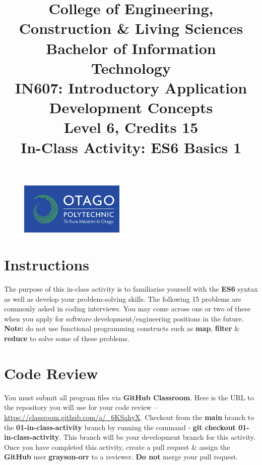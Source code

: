 \documentclass{article}
\author{}
\begin{document}
\begin{figure}
    \centering
    \includegraphics[width=50mm]{../img/logo.png}
\end{figure}

\title{College of Engineering, Construction \& Living Sciences\\Bachelor of Information Technology\\IN607: Introductory Application Development Concepts\\Level 6, Credits 15\\\textbf{In-Class Activity: ES6 Basics 1}}
\date{}
\maketitle
 
\section*{Instructions}
The purpose of this in-class activity is to familiarise yourself with the \textbf{ES6} syntax as well as develop your problem-solving skills. The following 15 problems are commonly asked in coding interviews. You may come across one or two of these when you apply for software development/engineering positions in the future. \textbf{Note:} do not use functional programming constructs such as \textbf{map}, \textbf{filter} \& \textbf{reduce} to solve some of these problems.

\section*{Code Review}
You must submit all program files via \textbf{GitHub Classroom}. Here is the URL to the repository you will use for your code review – \href{https://classroom.github.com/a/\_6KSahyX}{https://classroom.github.com/a/\_6KSahyX}. Checkout from the \textbf{main} branch to the \textbf{01-in-class-activity} branch by running the command - \textbf{git checkout 01-in-class-activity}. This branch will be your development branch for this activity. Once you have completed this activity, create a pull request \& assign the \textbf{GitHub} user \textbf{grayson-orr} to a reviewer. \textbf{Do not} merge your pull request.
\end{document}
